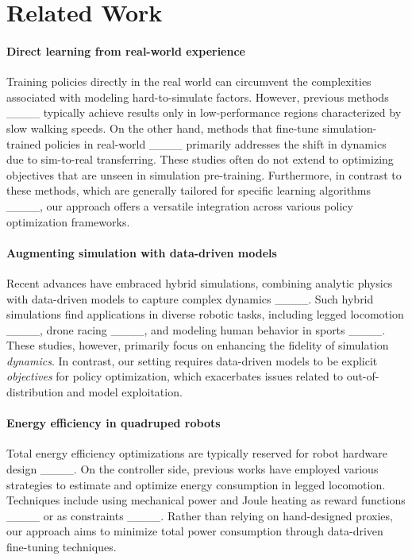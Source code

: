 \section{Related Work}
\paragraph{Direct learning from real-world experience}
Training policies directly in the real world can circumvent the complexities associated with modeling hard-to-simulate factors. However, previous methods ____ typically achieve results only in low-performance regions characterized by slow walking speeds. On the other hand, methods that fine-tune simulation-trained policies in real-world ____ primarily addresses the shift in dynamics due to sim-to-real transferring. These studies often do not extend to optimizing objectives that are unseen in simulation pre-training. Furthermore, in contrast to these methods, which are generally tailored for specific learning algorithms ____, our approach offers a versatile integration across various policy optimization frameworks.




\paragraph{Augmenting simulation with data-driven models} 
Recent advances have embraced hybrid simulations, combining analytic physics with data-driven models to capture complex dynamics ____. Such hybrid simulations find applications in diverse robotic tasks, including legged locomotion ____, drone racing ____,  and modeling human behavior in sports ____. These studies, however, primarily focus on enhancing the fidelity of simulation \textit{dynamics}. In contrast, our setting requires data-driven models to be explicit \textit{objectives} for policy optimization, which exacerbates issues related to out-of-distribution and model exploitation.

\paragraph{Energy efficiency in quadruped robots} 
Total energy efficiency optimizations are typically reserved for robot hardware design ____. On the controller side, previous works have employed various strategies to estimate and optimize energy consumption in legged locomotion. Techniques include using mechanical power and Joule heating as reward functions ____ or as constraints ____. Rather than relying on hand-designed proxies, our approach aims to minimize total power consumption through data-driven fine-tuning techniques.